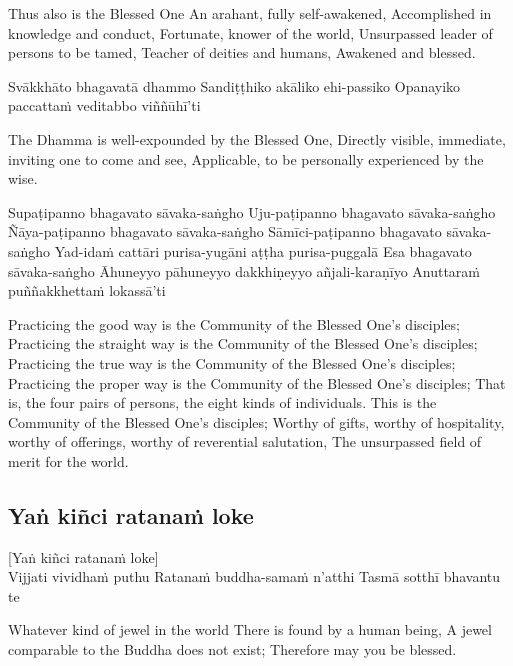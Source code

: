 \begin{english}
  Thus also is the Blessed One
  An arahant, fully self-awakened,
  Accomplished in knowledge and conduct,
  Fortunate, knower of the world,
  Unsurpassed leader of persons to be tamed,
  Teacher of deities and humans,
  Awakened and blessed.
\end{english}

Svākkhāto bhagavatā dhammo
Sandiṭṭhiko akāliko ehi-passiko
Opanayiko paccattaṁ veditabbo viññūhī’ti

\begin{english}
  The Dhamma is well-expounded by the Blessed One,
  Directly visible, immediate, inviting one to come and see,
  Applicable, to be personally experienced by the wise.
\end{english}

Supaṭipanno bhagavato sāvaka-saṅgho
Uju-paṭipanno bhagavato sāvaka-saṅgho
Ñāya-paṭipanno bhagavato sāvaka-saṅgho
Sāmīci-paṭipanno bhagavato sāvaka-saṅgho
Yad-idaṁ cattāri purisa-yugāni aṭṭha purisa-puggalā
Esa bhagavato sāvaka-saṅgho
Āhuneyyo pāhuneyyo dakkhiṇeyyo añjali-karaṇīyo
Anuttaraṁ puññakkhettaṁ lokassā’ti

\begin{english}
  Practicing the good way is the Community of the Blessed One’s disciples;
  Practicing the straight way is the Community of the Blessed One’s disciples;
  Practicing the true way is the Community of the Blessed One’s disciples;
  Practicing the proper way is the Community of the Blessed One’s disciples;
  That is, the four pairs of persons, the eight kinds of individuals.
  This is the Community of the Blessed One’s disciples;
  Worthy of gifts, worthy of hospitality, worthy of offerings, worthy of reverential salutation,
  The unsurpassed field of merit for the world.
\end{english}

\suttaRef{[SN 11.3]}

\subsection{Yaṅ kiñci ratanaṁ loke}
[Yaṅ kiñci ratanaṁ loke]\\
Vijjati vividhaṁ puthu
Ratanaṁ buddha-samaṁ n’atthi
Tasmā sotthī bhavantu te

\begin{english}
  Whatever kind of jewel in the world
  There is found by a human being,
  A jewel comparable to the Buddha does not exist;
  Therefore may you be blessed.
\end{english}


